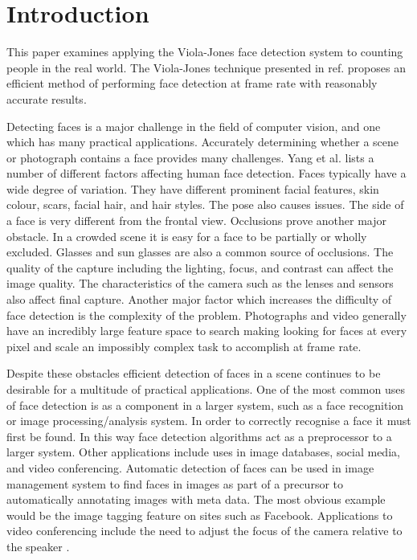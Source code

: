 \documentclass[conference]{IEEEtran}
\begin{document}




%
\IEEEpeerreviewmaketitle



\section{Introduction} \label{sec:introduction}
This paper examines applying the Viola-Jones face detection system \cite{viola2004robust} to counting people in the real world. The Viola-Jones technique presented in ref. \cite{viola2004robust} proposes an efficient method of performing face detection at frame rate with reasonably accurate results.

Detecting faces is a major challenge in the field of computer vision, and one which has many practical applications. Accurately determining whether a scene or photograph contains a face provides many challenges. Yang et al. \cite{yang2002detecting} lists a number of different factors affecting human face detection. Faces typically have a wide degree of variation. They have different prominent facial features, skin colour, scars, facial hair, and hair styles. The pose also causes issues. The side of a face is very different from the frontal view. Occlusions prove another major obstacle. In a crowded scene it is easy for a face to be partially or wholly excluded. Glasses and sun glasses are also a common source of occlusions. The quality of the capture including the lighting, focus, and contrast can affect the image quality. The characteristics of the camera such as the lenses and sensors also affect final capture. Another major factor which increases the difficulty of face detection is the complexity of the problem. Photographs and video generally have an incredibly large feature space to search making looking for faces at every pixel and scale an impossibly complex task to accomplish at frame rate.

Despite these obstacles efficient detection of faces in a scene continues to be desirable for a multitude of practical applications. One of the most common uses of face detection is as a component in a larger system, such as a face recognition or image processing/analysis system. In order to correctly recognise a face it must first be found. In this way face detection algorithms act as a preprocessor to a larger system. Other applications include uses in image databases, social media, and video conferencing. Automatic detection of faces can be used in image management system to find faces in images as part of a precursor to automatically annotating images with meta data. The most obvious example would be the image tagging feature on sites such as Facebook. Applications to video conferencing include the need to adjust the focus of the camera relative to the speaker \cite{hjelmaas2001face}. 
\end{document}
